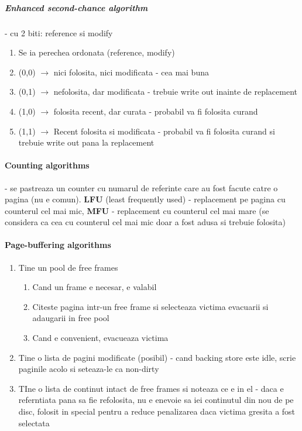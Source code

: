 \documentclass{article}
\begin{document}
\subparagraph*{Enhanced second-chance algorithm} - cu 2 biti: reference si modify
\begin{enumerate}
    \item Se ia perechea ordonata (reference, modify)
    \item (0,0) $\rightarrow$ nici folosita, nici modificata - cea mai buna
    \item (0,1) $\rightarrow$ nefolosita, dar modificata - trebuie write out inainte de replacement
    \item (1,0) $\rightarrow$ folosita recent, dar curata - probabil va fi folosita curand
    \item (1,1) $\rightarrow$ Recent folosita si modificata - probabil va fi folosita curand si trebuie write out pana la replacement
\end{enumerate}

\paragraph*{Counting algorithms} - se pastreaza un counter cu numarul de referinte care au fost facute catre o pagina (nu e comun). \textbf{LFU} (least frequently used) - replacement pe pagina cu counterul cel mai mic, \textbf{MFU} - replacement cu counterul cel mai mare (se considera ca cea cu counterul cel mai mic doar a fost adusa si trebuie folosita)

\paragraph*{Page-buffering algorithms}
\begin{enumerate}
    \item Tine un pool de free frames
    \begin{enumerate}
        \item Cand un frame e necesar, e valabil
        \item Citeste pagina intr-un free frame si selecteaza victima evacuarii si adaugarii in free pool
        \item Cand e convenient, evacueaza victima
    \end{enumerate}
    \item Tine o lista de pagini modificate (posibil) - cand backing store este idle, scrie paginile acolo si seteaza-le ca non-dirty
    \item TIne o lista de continut intact de free frames si noteaza ce e in el - daca e referntiata pana sa fie refolosita, nu e enevoie sa iei continutul din nou de pe disc, folosit in special pentru a reduce penalizarea daca victima gresita a fost selectata
\end{enumerate}
\end{document}
